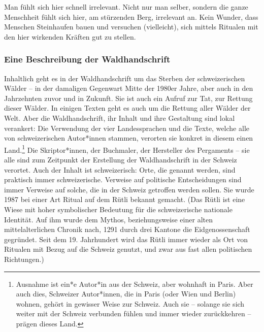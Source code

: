\documentclass[a4paper,
fontsize=11pt,
oneside,
numbers=noperiodatend,
parskip=half-,
bibliography=totoc,
final
]{scrartcl}
\begin{document}
Man fühlt sich hier schnell irrelevant. Nicht nur man selber, sondern
die ganze Menschheit fühlt sich hier, am stürzenden Berg, irrelevant an.
Kein Wunder, dass Menschen Steinhaufen bauen und versuchen (vielleicht),
sich mittels Ritualen mit den hier wirkenden Kräften gut zu stellen.

\subsubsection{Eine Beschreibung der
Waldhandschrift}\label{eine-beschreibung-der-waldhandschrift}

Inhaltlich geht es in der Waldhandschrift um das Sterben der
schweizerischen Wälder -- in der damaligen Gegenwart Mitte der 1980er
Jahre, aber auch in den Jahrzehnten zuvor und in Zukunft. Sie ist auch
ein Aufruf zur Tat, zur Rettung dieser Wälder. In einigen Texten geht es
auch um die Rettung aller Wälder der Welt. Aber die Waldhandschrift, ihr
Inhalt und ihre Gestaltung sind lokal verankert: Die Verwendung der vier
Landessprachen und die Texte, welche alle von schweizerischen
Autor*innen stammen, verorten sie konkret in diesem einen
Land.\footnote{Ausnahme ist ein*e Autor*in aus der Schweiz, aber
  wohnhaft in Paris. Aber auch dies, Schweizer Autor*innen, die in Paris
  (oder Wien und Berlin) wohnen, gehört in gewisser Weise zur Schweiz.
  Auch sie -- solange sie sich weiter mit der Schweiz verbunden fühlen
  und immer wieder zurückkehren -- prägen dieses Land.} Die
Skriptor*innen, der Buchmaler, der Hersteller des Pergaments -- sie alle
sind zum Zeitpunkt der Erstellung der Waldhandschrift in der Schweiz
verortet. Auch der Inhalt ist schweizerisch: Orte, die genannt werden,
sind praktisch immer schweizerische. Verweise auf politische
Entscheidungen sind immer Verweise auf solche, die in der Schweiz
getroffen werden sollen. Sie wurde 1987 bei einer Art Ritual auf dem
Rütli bekannt gemacht. (Das Rütli ist eine Wiese mit hoher symbolischer
Bedeutung für die schweizerische nationale Identität. Auf ihm wurde dem
Mythos, beziehungsweise einer alten mittelalterlichen Chronik nach, 1291
durch drei Kantone die Eidgenossenschaft gegründet. Seit dem 19.
Jahrhundert wird das Rütli immer wieder als Ort von Ritualen mit Bezug
auf die Schweiz genutzt, und zwar aus fast allen politischen
Richtungen.)
\end{document}
